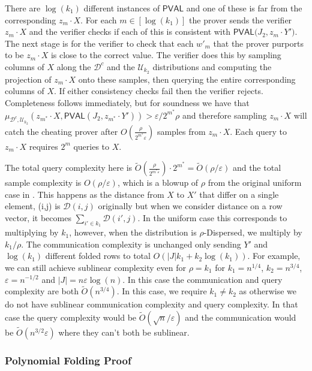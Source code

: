 \documentclass[10pt,a4paper]{article}
\newcommand{\PVAL}{\mathsf{PVAL}}
\begin{document}
There are $\log (k_{1})$ different instances of $\PVAL$ and one of these is far from the corresponding $z_{m}\cdot X$. For each $m\in [\log (k_{1})]$ the prover sends the verifier $z_{m}\cdot X$  and the verifier checks if each of this is consistent with $\PVAL\bigg(J_{2}, z_{m}\cdot Y'\bigg)$. The next stage is for the verifier to check that each $w'_{m}$ that the prover purports to be $z_{m}\cdot X$ is close to the correct value. The verifier does this by sampling columns of $X$ along the $\mathcal{D}^{c}$ and the $\mathcal{U}_{k_{2}}$ distributions and computing the projection of $z_{m}\cdot X$ onto these samples, then querying the entire corresponding columns of $X$. If either consistency checks fail then the verifier rejects. Completeness follows immediately, but for soundness we have that $\mu_{\mathcal{D}^{c}, \mathcal{U}_{k_{2}}}(z_{m^{\ast}}\cdot X,\PVAL(J_{2}, z_{m^{\ast}}\cdot Y'))>\varepsilon/2^{m^{\ast}}\rho$ and therefore sampling $ z_{m}\cdot X$ will catch the cheating prover after $O(\frac{\rho}{2^{m^{\ast}}\varepsilon})$ samples from $z_{m}\cdot X$. Each query to $z_{m}\cdot X$ requires $2^{m}$ queries to $X$.

The total query complexity here is $\tilde{O}(\frac{\rho}{2^{m^{\ast}\varepsilon}})\cdot 2^{m^{\ast}} =\tilde{O}(\rho/\varepsilon)$ and the total sample complexity is $O(\rho/\varepsilon)$, which is a blowup of $\rho$ from the original uniform case in \cite{RVW}. This happens as the distance from $X$ to $X'$ that differ on a single element, (i,j) is $\mathcal{D}(i,j)$ originally but when we consider distance on a row vector, it becomes $\sum_{i'\in k_{1}}\mathcal{D}(i', j)$. In the uniform case this corresponds to multiplying by $k_{1}$, however, when the distribution is $\rho$-Dispersed, we multiply by $k_{1}/\rho$. The communication complexity is unchanged only sending $Y'$ and $\log(k_{1})$ different folded rows to total $O(|J|k_{1}+k_2 \log (k_{1}))$. For example, we can still achieve sublinear complexity even for $\rho=k_{1}$ for $k_{1}=n^{1/4}$, $k_{2}=n^{3/4}$, $\varepsilon=n^{-1/2}$ and $|J|=n\varepsilon\log (n)$. In this case the communication and query complexity are both $\tilde{O}(n^{3/4})$. In this case, we require $k_{1}\neq k_{2}$ as otherwise we do not have sublinear communication complexity and query complexity. In that case the query complexity would be $\tilde{O}(\sqrt{n}/\varepsilon)$ and the communication would be $\tilde{O}(n^{3/2}\varepsilon)$ where they can't both be sublinear.

\subsubsection{Polynomial Folding Proof}
\end{document}
